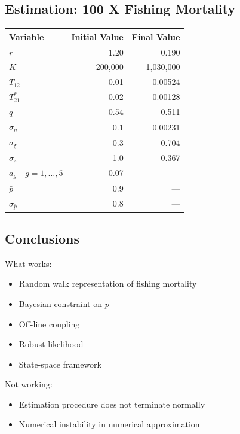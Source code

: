 \documentclass[a4paper,KOMA,landscape,titlepage]{powersem}
\begin{document}
\begin{slide}\section{Estimation: 100 X Fishing Mortality}
{%
\begin{center}
\begin{tabular}{lrr}
\hline
Variable & Initial Value & Final Value\\
\hline
\hline
$r$ & 1.20&  0.190\\
$K$ & 200,000 & 1,030,000 \\
$T_{12}$ & 0.01 & 0.00524\\
$T^*_{21}$& 0.02 & 0.00128\\
$q$ & 0.54 & 0.511\\
\hline
$\sigma_\eta$ & 0.1 & 0.00231\\
$\sigma_\xi$ & 0.3 & 0.704\\
$\sigma_\varepsilon$ & 1.0 & 0.367\\
$a_g\quad g=1,\dots,5$ & 0.07 & ---\\
\hline
$\bar{p}$ & 0.9 & ---\\
$\sigma_{\bar{p}}$ & 0.8 & ---\\
\hline
\end{tabular}
\end{center}
}
\end{slide}

\begin{slide}\section{Conclusions}
What works:
\begin{itemize}
\item Random walk representation of fishing mortality
\item Bayesian constraint on $\bar{p}$
\item Off-line coupling 
\item Robust likelihood
\item State-space framework
\end{itemize}
Not working:
\begin{itemize}
\item Estimation procedure does not terminate normally
\item Numerical instability in numerical approximation
\end{itemize}
\end{slide}
\end{document}
